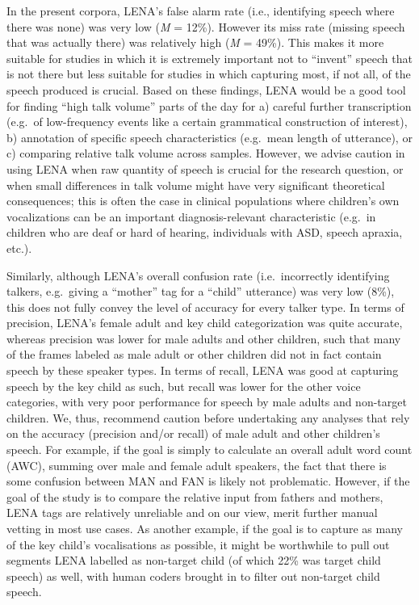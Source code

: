 \documentclass[english,floatsintext,man]{apa6}
\begin{document}
In the present corpora, LENA's false alarm rate (i.e., identifying
speech where there was none) was very low (\emph{M} = 12\%). However its
miss rate (missing speech that was actually there) was relatively high
(\emph{M} = 49\%). This makes it more suitable for studies in which it
is extremely important not to \enquote{invent} speech that is not there
but less suitable for studies in which capturing most, if not all, of
the speech produced is crucial. Based on these findings, LENA would be a
good tool for finding \enquote{high talk volume} parts of the day for a)
careful further transcription (e.g.~of low-frequency events like a
certain grammatical construction of interest), b) annotation of specific
speech characteristics (e.g.~mean length of utterance), or c) comparing
relative talk volume across samples. However, we advise caution in using
LENA when raw quantity of speech is crucial for the research question,
or when small differences in talk volume might have very significant
theoretical consequences; this is often the case in clinical populations
where children's own vocalizations can be an important
diagnosis-relevant characteristic (e.g.~in children who are deaf or hard
of hearing, individuals with ASD, speech apraxia, etc.).

Similarly, although LENA's overall confusion rate (i.e.~incorrectly
identifying talkers, e.g.~giving a \enquote{mother} tag for a
\enquote{child} utterance) was very low (8\%), this does not fully
convey the level of accuracy for every talker type. In terms of
precision, LENA's female adult and key child categorization was quite
accurate, whereas precision was lower for male adults and other
children, such that many of the frames labeled as male adult or other
children did not in fact contain speech by these speaker types. In terms
of recall, LENA was good at capturing speech by the key child as such,
but recall was lower for the other voice categories, with very poor
performance for speech by male adults and non-target children. We, thus,
recommend caution before undertaking any analyses that rely on the
accuracy (precision and/or recall) of male adult and other children's
speech. For example, if the goal is simply to calculate an overall adult
word count (AWC), summing over male and female adult speakers, the fact
that there is some confusion between MAN and FAN is likely not
problematic. However, if the goal of the study is to compare the
relative input from fathers and mothers, LENA tags are relatively
unreliable and on our view, merit further manual vetting in most use
cases. As another example, if the goal is to capture as many of the key
child's vocalisations as possible, it might be worthwhile to pull out
segments LENA labelled as non-target child (of which 22\% was target
child speech) as well, with human coders brought in to filter out
non-target child speech.
\end{document}
